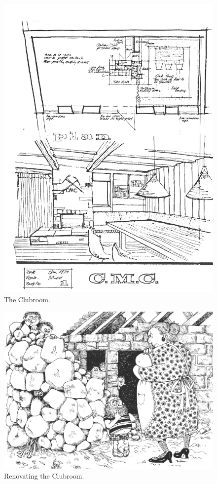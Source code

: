 \documentclass[a5paper,openany,font 10pt]{scrbook}
\begin{document}
\begin{figure}[htb]
\centering
\includegraphics[width=.9\linewidth]{./images/Plan2.jpg}
\caption{\label{fig:org4ac23ed}
The Clubroom.}
\end{figure}

\begin{figure}[htb]
\centering
\includegraphics[width=.9\linewidth]{./images/Cartoon_01.jpg}
\caption{\label{fig:org37f0ef9}
Renovating the Clubroom.}
\end{figure}
\end{document}
